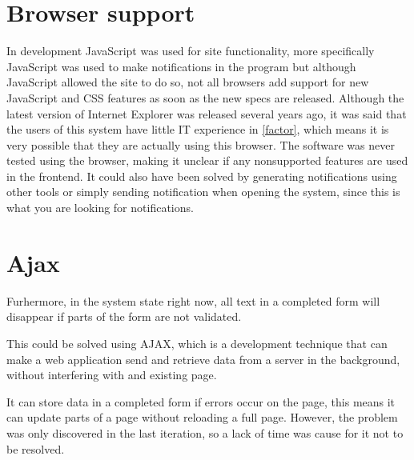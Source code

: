\section{Browser support}
In development JavaScript was used for site functionality, more specifically JavaScript was used to make notifications in the program but although JavaScript allowed the site to do so, not all browsers add support for new JavaScript and CSS features as soon as the new specs are released.
Although the latest version of Internet Explorer was released several years ago, it was said that the users of this system have little IT experience in \cref{factor}, which means it is very possible that they are actually using this browser.
The software was never tested using the browser, making it unclear if any nonsupported features are used in the frontend.
It could also have been solved by generating notifications using other tools or simply sending notification when opening the system, since this is what you are looking for notifications.

\section{Ajax}

Furhermore, in the system state right now, all text in a completed form will disappear if parts of the form are not validated.

This could be solved using AJAX, which is a development technique that can make a web application send and retrieve data from a server in the background, without interfering with and existing page.

It can store data in a completed form if errors occur on the page, this means it can update parts of a page without reloading a full page.
However, the problem was only discovered in the last iteration, so a lack of time was cause for it not to be resolved.
